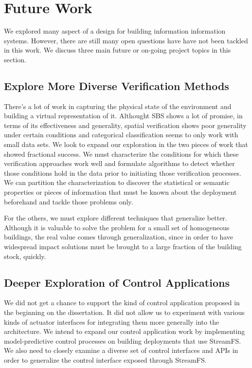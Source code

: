 \section{Future Work}

We explored many aspect of a design for building information information systems.  However, there are still many open questions have
have not been tackled in this work.  We discuss three main future or on-going project topics in this section.

\subsection{Explore More Diverse Verification Methods}
There's a lot of work in capturing the physical state of the environment and building a virtual representation of it.
Althought SBS shows a lot of promise, in terms of its effectiveness and generality, spatial verification shows poor generality 
under certain conditions and categorical classification seems to only work with small data sets.  We look to expand our 
exploration in the two pieces of work that showed fractional success.  We must characterize the conditions for which these
verification approaches work well and formulate algorithms to detect whether those conditions hold in the data prior to
initiating those verification processes.  We can partition the characterization to discover the statistical or semantic 
properties or pieces of information that must be known about the deployment beforehand and tackle those problems only.

For the others, we must explore different techniques that generalize better.  Although it is valuable to solve the problem for
a small set of homogeneous buildings, the real value comes through generalization, since in order to have widespread impact
solutions must be brought to a large fraction of the building stock, quickly.



\subsection{Deeper Exploration of Control Applications}
We did not get a chance to support the kind of control application proposed in the beginning on the dissertation.  It did not
allow us to experiment with various kinds of actuator interfaces for integrating them more generally into the architecture.
We intend to expand our control application work by implementing model-predictive control processes on building deployments
that use StreamFS.  We also need to closely examine a diverse set of control interfaces and APIs in order to generalize
the control interface exposed through StreamFS.

